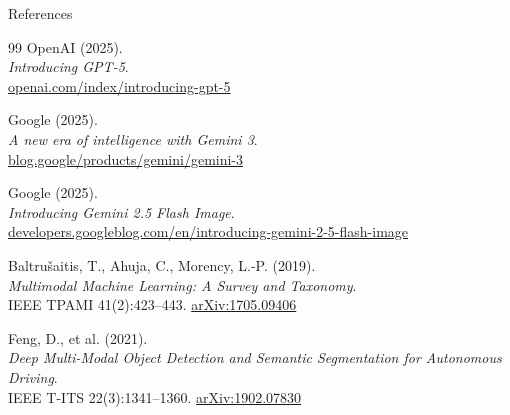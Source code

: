 \begin{frame}[allowframebreaks]{References}
\begin{thebibliography}{99}
      OpenAI (2025). \\
      \emph{Introducing GPT-5}.\\
      \href{https://openai.com/index/introducing-gpt-5/}{openai.com/index/introducing-gpt-5}

      Google (2025). \\
      \emph{A new era of intelligence with Gemini 3}.\\
      \href{https://blog.google/products/gemini/gemini-3/}{blog.google/products/gemini/gemini-3}

      Google (2025). \\
      \emph{Introducing Gemini 2.5 Flash Image}.\\
      \href{https://developers.googleblog.com/en/introducing-gemini-2-5-flash-image/}{developers.googleblog.com/en/introducing-gemini-2-5-flash-image}

      Baltru\v{s}aitis, T., Ahuja, C., Morency, L.-P. (2019). \\
      \emph{Multimodal Machine Learning: A Survey and Taxonomy}.\\
      IEEE TPAMI 41(2):423--443. \href{https://arxiv.org/abs/1705.09406}{arXiv:1705.09406}

      Feng, D., et al. (2021). \\
      \emph{Deep Multi-Modal Object Detection and Semantic Segmentation for Autonomous Driving}.\\
      IEEE T-ITS 22(3):1341--1360. \href{https://arxiv.org/abs/1902.07830}{arXiv:1902.07830}
  \end{thebibliography}
\end{frame}

